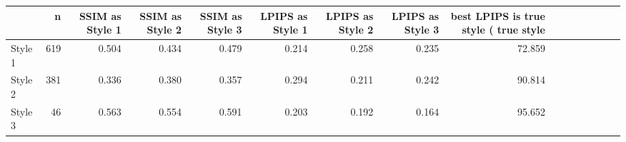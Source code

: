 \begin{tabular}{lrrrrrrrr}
\toprule
 & n & SSIM as Style 1 & SSIM as Style 2 & SSIM as Style 3 & LPIPS as Style 1 & LPIPS as Style 2 & LPIPS as Style 3 & best LPIPS is true style (%
true style &  &  &  &  &  &  &  &  \\
\midrule
Style 1 & 619 & 0.504 & 0.434 & 0.479 & 0.214 & 0.258 & 0.235 & 72.859 \\
Style 2 & 381 & 0.336 & 0.380 & 0.357 & 0.294 & 0.211 & 0.242 & 90.814 \\
Style 3 & 46 & 0.563 & 0.554 & 0.591 & 0.203 & 0.192 & 0.164 & 95.652 \\
\bottomrule
\end{tabular}
